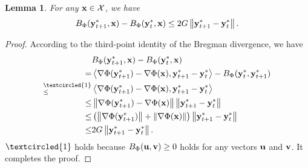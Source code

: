 \documentclass[journal]{IEEEtran}
\newtheorem{Lemma}{\bf{Lemma}}
\begin{document}
\begin{Lemma}
\label{lemma_dynamic_regret_bound}
For any ${\bf x}\in{\mathcal{X}}$, we have
\begin{align}
\label{equa_theorem_upper_bound_oa_temp2}
B_\Phi({\bf y}_{t+1}^\ast, {\bf x}) - B_{\Phi}({\bf y}_t^\ast, {\bf x}) \le  2G \left\lVert{\bf y}_{t+1}^\ast - {\bf y}_t^\ast\right\rVert.
\end{align}
\end{Lemma}
\begin{proof}

According to the third-point identity of the Bregman divergence, we have
\begin{align}
\nonumber
&  B_\Phi(\y_{t+1}^\ast, \x) - B_{\Phi}(\y_t^\ast, \x) \\ \nonumber
= & \lrangle{\nabla \Phi(\y_{t+1}^\ast) - \nabla \Phi(\x), \y_{t+1}^\ast - \y_t^\ast} - B_{\Phi}(\y_t^\ast, \y_{t+1}^\ast) \\ \nonumber
\refabovecir{\le}{\textcircled{1}} &  \lrangle{\nabla \Phi(\y_{t+1}^\ast) - \nabla \Phi(\x), \y_{t+1}^\ast - \y_t^\ast} \\ \nonumber
\le & \lrnorm{\nabla \Phi(\y_{t+1}^\ast) - \nabla \Phi(\x)} \lrnorm{ \y_{t+1}^\ast - \y_t^\ast} \\ \nonumber
\le & \lrincir{\lrnorm{\nabla \Phi(\y_{t+1}^\ast)} + \lrnorm{ \nabla \Phi(\x)}} \lrnorm{ \y_{t+1}^\ast - \y_t^\ast} \\ \label{equa_theorem_upper_bound_oa_temp2}
\le & 2G \lrnorm{\y_{t+1}^\ast - \y_t^\ast}.
\end{align} $\textcircled{1}$ holds because $B_{\Phi}({\bf u},{\bf v}) \ge 0$ holds for any vectors ${\bf u}$ and ${\bf v}$. It completes the proof.
\end{proof}
\end{document}

